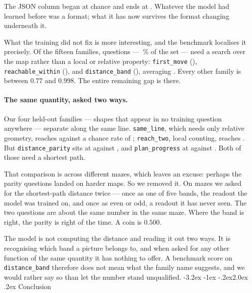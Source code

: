\documentclass[11pt]{article}
\makeatletter
\renewcommand\section{\@startsection{section}{1}{\z@}%
  {-3.2ex \@plus -1ex \@minus -.2ex}{2.0ex \@plus.2ex}%
  {\normalfont\large\bfseries\color{accent}}}
\newcommand{\1}{\mathbf{1}}
\makeatother
\begin{document}
\noindent The JSON column began at chance and ends at \surfJson{}. Whatever the model had learned
before was a format; what it has now survives the format changing underneath it.

What the training did not fix is more interesting, and the benchmark localises it precisely. Of the
fifteen families, \searchFamN{} questions --- \searchFamShare{}\,\% of the set --- need a search
over the map rather than a local or relative property: \texttt{first\_move} (\famFirstMove{}),
\texttt{reachable\_within} (\famReachableWithin{}), and \texttt{distance\_band}
(\famDistanceBand{}), averaging \searchFamAcc{}. Every other family is between 0.77 and 0.998. The
entire remaining gap is there.

\paragraph{The same quantity, asked two ways.} Our four held-out families --- shapes that appear in
no training question anywhere --- separate along the same line. \texttt{same\_line}, which needs
only relative geometry, reaches \hoSameLine{} against a chance rate of \hoSameLineChance{};
\texttt{reach\_two}, local counting, reaches \hoReachTwo{}. But \texttt{distance\_parity} sits at
\hoDistanceParity{} against \hoDistanceParityChance{}, and \texttt{plan\_progress} at
\hoPlanProgress{} against \hoPlanProgressChance{}. Both of those need a shortest path.

That comparison is across different mazes, which leaves an excuse: perhaps the parity questions
landed on harder maps. So we removed it. On \probeN{} mazes we asked for the shortest-path distance
twice --- once as one of five bands, the readout the model was trained on, and once as even or odd,
a readout it has never seen. The two questions are about the same number in the same maze. Where
the band is right, the parity is right \probeCond{} of the time. A coin is $0.500$.

The model is not computing the distance and reading it out two ways. It is recognising which band a
picture belongs to, and when asked for any other function of the same quantity it has nothing to
offer. A benchmark score on \texttt{distance\_band} therefore does not mean what the family name
suggests, and we would rather say so than let the number stand unqualified.
\section{Conclusion}
\end{document}
